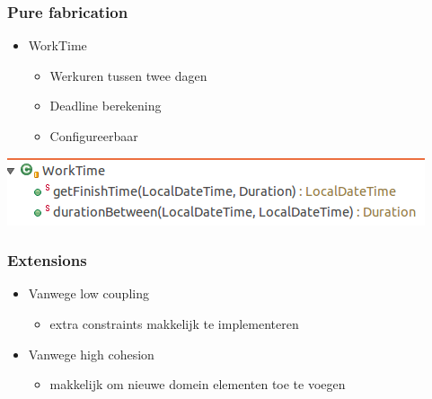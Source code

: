\documentclass{beamer}
\begin{document}
%

\begin{frame}
\frametitle{Pure fabrication}
\begin{itemize}
\item WorkTime
\begin{itemize}
\item Werkuren tussen twee dagen 
\item Deadline berekening
\item Configureerbaar
\end{itemize}
\end{itemize}
\includegraphics[width=0.8\paperwidth]{figures/WorkTime.png}
\end{frame}

%

\begin{frame}
\frametitle{Extensions}
\begin{itemize}
\item Vanwege low coupling
\begin{itemize}
\item extra constraints makkelijk te implementeren
\end{itemize}
\item Vanwege high cohesion
\begin{itemize}
\item makkelijk om nieuwe domein elementen toe te voegen
\end{itemize}
\end{itemize}
\end{frame}

%
\end{document}
